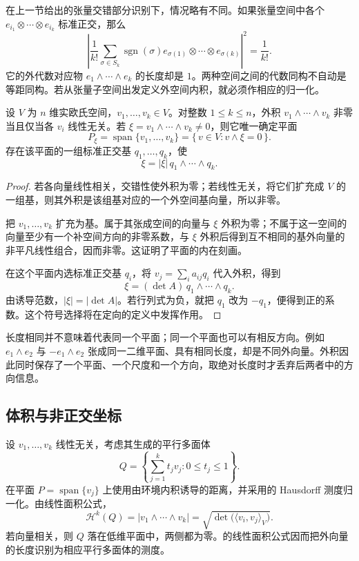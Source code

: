 \ProseParagraphBreak

在上一节给出的张量交错部分识别下，情况略有不同。如果张量空间中各个 \(e_{i_1}\otimes\cdots\otimes e_{i_k}\) 标准正交，那么
\[
 \left|
   \frac1{k!}\sum_{\sigma\in S_k}
       \operatorname{sgn}(\sigma)
       e_{\sigma(1)}\otimes\cdots\otimes e_{\sigma(k)}
 \right|^2=\frac1{k!}.
\]
它的外代数对应物 \(e_1\wedge\cdots\wedge e_k\) 的长度却是 \(1\)。两种空间之间的代数同构不自动是等距同构。若从张量子空间出发定义外空间内积，就必须作相应的归一化。

\begin{proposition}\label{b1:prop:app-b-decomposable-plane}
设 \(V\) 为 \(n\) 维实欧氏空间，\(v_1,\ldots,v_k\in V\)。对整数 \(1\leq k\leq n\)，外积 \(v_1\wedge\cdots\wedge v_k\) 非零当且仅当各 \(v_i\) 线性无关。若
\(\xi=v_1\wedge\cdots\wedge v_k\ne0\)，则它唯一确定平面
\[
 P_\xi=\operatorname{span}\{v_1,\ldots,v_k\}
      =\{\,v\in V:v\wedge\xi=0\,\}.
\]
存在该平面的一组标准正交基 \(q_1,\ldots,q_k\)，使
\[
 \xi=|\xi|\,q_1\wedge\cdots\wedge q_k.
\]
\end{proposition}
\begin{proof}
若各向量线性相关，交错性使外积为零；若线性无关，将它们扩充成 \(V\) 的一组基，则其外积是该组基对应的一个外空间基向量，所以非零。

把 \(v_1,\ldots,v_k\) 扩充为基。属于其张成空间的向量与 \(\xi\) 外积为零；不属于这一空间的向量至少有一个补空间方向的非零系数，与 \(\xi\) 外积后得到互不相同的基外向量的非平凡线性组合，因而非零。这证明了平面的内在刻画。

在这个平面内选标准正交基 \(q_i\)，将 \(v_j=\sum_i a_{ij}q_i\) 代入外积，得到
\[
 \xi=(\det A)\,q_1\wedge\cdots\wedge q_k.
\]
由诱导范数，\(|\xi|=|\det A|\)。若行列式为负，就把 \(q_1\) 改为 \(-q_1\)，便得到正的系数。这个符号选择将在定向的定义中发挥作用。
\end{proof}

长度相同并不意味着代表同一个平面；同一个平面也可以有相反方向。例如 \(e_1\wedge e_2\) 与 \(-e_1\wedge e_2\) 张成同一二维平面、具有相同长度，却是不同外向量。外积因此同时保存了一个平面、一个尺度和一个方向，取绝对长度时才丢弃后两者中的方向信息。

\subsection{体积与非正交坐标}
\label{b1:subsec:B10302}

设 \(v_1,\ldots,v_k\) 线性无关，考虑其生成的平行多面体
\[
 Q=\left\{\sum_{j=1}^k t_jv_j:0\leq t_j\leq1\right\}.
\]
在平面 \(P=\operatorname{span}\{v_j\}\) 上使用由环境内积诱导的距离，并采用的 Hausdorff 测度归一化。由线性面积公式，
\begin{equation}\label{b1:eq:app-b-parallelepiped-volume}
 \mathcal H^k(Q)
 =|v_1\wedge\cdots\wedge v_k|
 =\sqrt{\det\bigl(\langle v_i,v_j\rangle_V\bigr)}.
\end{equation}
若向量相关，则 \(Q\) 落在低维平面中，两侧都为零。的线性面积公式因而把外向量的长度识别为相应平行多面体的测度。

